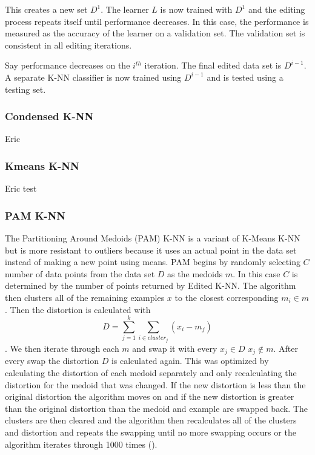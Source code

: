 \documentclass[twoside,11pt]{article}
\begin{document}
This creates a new set $D^1$. The learner $L$ is now trained with $D^1$ and the editing process repeats itself until performance decreases. In this case, the performance is measured as the accuracy of the learner on a validation set. The validation set is consistent in all editing iterations.

Say performance decreases on the $i^{th}$ iteration. The final edited data set is $D^{i-1}$. A separate K-NN classifier is now trained using $D^{i-1}$ and is tested using a testing set.





\subsubsection{Condensed K-NN}

Eric

\subsubsection{Kmeans K-NN}

Eric test

\subsubsection{PAM K-NN}
The Partitioning Around Medoids (PAM) K-NN is a variant of K-Means K-NN but is more resistant to outliers because it uses an actual point in the data set instead of making a new point using means. PAM begins by randomly selecting $C$ number of data points from the data set $D$ as the medoids $m$. In this case $C$ is determined by the number of points returned by Edited K-NN. The algorithm then clusters all of the remaining examples $x$ to the closest corresponding $m_i \in m$. Then the distortion is calculated with $$D = \sum_{j=1}^{k}\sum_{i \in cluster_j} (x_i - m_j)$$. We then iterate through each $m$ and swap it with every $x_j \in D$ $x_j \notin m$. After every swap the distortion $D$ is calculated again. This was optimized by calculating the distortion of each medoid separately and only recalculating the distortion for the medoid that was changed. If the new distortion is less than the original distortion the algorithm moves on and if the new distortion is greater than the original distortion than the medoid and example are swapped back. The clusters are then cleared and the algorithm then recalculates all of the clusters and distortion and repeats the swapping until no more swapping occurs or the algorithm iterates through 1000 times (\cite{Fox1990FindingGI}).
\end{document}
